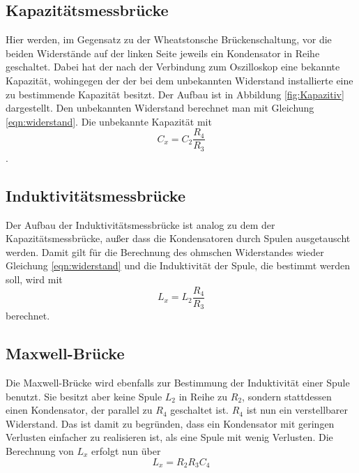     \subsection{Kapazitätsmessbrücke}
    Hier werden, im Gegensatz zu der Wheatstonsche Brückenschaltung, vor die beiden Widerstände auf der linken Seite jeweils ein Kondensator in Reihe geschaltet.
    Dabei hat der nach der Verbindung zum Oszilloskop eine bekannte Kapazität, wohingegen der der bei dem unbekannten Widerstand installierte eine zu bestimmende Kapazität besitzt.
    Der Aufbau ist in Abbildung \ref{fig:Kapazitiv} dargestellt.
    Den unbekannten Widerstand berechnet man mit Gleichung \ref{eqn:widerstand}.
    Die unbekannte Kapazität mit 
    \begin{equation}
        C_x=C_2 \frac{R_4}{R_3}
        \label{eqn:kapazität}
    \end{equation}.

    \subsection{Induktivitätsmessbrücke}
    Der Aufbau der Induktivitätsmessbrücke ist analog zu dem der Kapazitätsmessbrücke, außer dass die Kondensatoren durch Spulen ausgetauscht werden.
    Damit gilt für die Berechnung des ohmschen Widerstandes wieder Gleichung \ref{eqn:widerstand} und die Induktivität der Spule, die bestimmt werden soll, wird mit 
    \begin{equation}
        L_x=L_2 \frac{R_4}{R_3}
        \label{eqn:Induktivität}
    \end{equation}
    berechnet.\\

    \subsection{Maxwell-Brücke}
    Die Maxwell-Brücke wird ebenfalls zur Bestimmung der Induktivität einer Spule benutzt.
    Sie besitzt aber keine Spule $L_2$ in Reihe zu $R_2$, sondern stattdessen einen Kondensator, der parallel zu $R_4$ geschaltet ist.
    $R_4$ ist nun ein verstellbarer Widerstand. Das ist damit zu begründen, dass ein Kondensator mit geringen Verlusten einfacher zu realisieren ist, als eine Spule mit wenig Verlusten.
    Die Berechnung von $L_x$ erfolgt nun über
    \begin{equation}
        L_x=R_2 R_3 C_4
    \end{equation}

